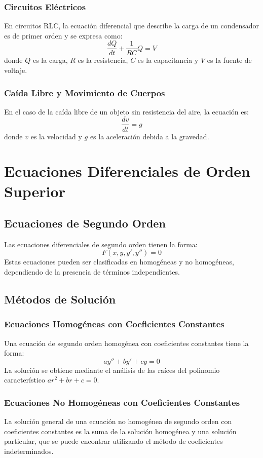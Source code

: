 \documentclass{article}
\begin{document}
\subsubsection{Circuitos Eléctricos}
En circuitos RLC, la ecuación diferencial que describe la carga de un condensador es de primer orden y se expresa como:
\[
\frac{dQ}{dt} + \frac{1}{RC}Q = V
\]
donde \( Q \) es la carga, \( R \) es la resistencia, \( C \) es la capacitancia y \( V \) es la fuente de voltaje.

\subsubsection{Caída Libre y Movimiento de Cuerpos}
En el caso de la caída libre de un objeto sin resistencia del aire, la ecuación es:
\[
\frac{dv}{dt} = g
\]
donde \( v \) es la velocidad y \( g \) es la aceleración debida a la gravedad.

\section{Ecuaciones Diferenciales de Orden Superior}

\subsection{Ecuaciones de Segundo Orden}
Las ecuaciones diferenciales de segundo orden tienen la forma:
\[
F(x, y, y', y'') = 0
\]
Estas ecuaciones pueden ser clasificadas en homogéneas y no homogéneas, dependiendo de la presencia de términos independientes.

\subsection{Métodos de Solución}

\subsubsection{Ecuaciones Homogéneas con Coeficientes Constantes}
Una ecuación de segundo orden homogénea con coeficientes constantes tiene la forma:
\[
ay'' + by' + cy = 0
\]
La solución se obtiene mediante el análisis de las raíces del polinomio característico \( ar^2 + br + c = 0 \).

\subsubsection{Ecuaciones No Homogéneas con Coeficientes Constantes}
La solución general de una ecuación no homogénea de segundo orden con coeficientes constantes es la suma de la solución homogénea y una solución particular, que se puede encontrar utilizando el método de coeficientes indeterminados.
\end{document}
